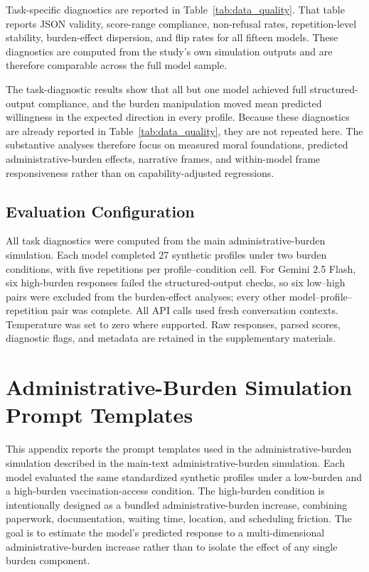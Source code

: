 Task-specific diagnostics are reported in Table~\ref{tab:data_quality}. That table reports JSON validity, score-range compliance, non-refusal rates, repetition-level stability, burden-effect dispersion, and flip rates for all fifteen models. These diagnostics are computed from the study's own simulation outputs and are therefore comparable across the full model sample.

The task-diagnostic results show that all but one model achieved full structured-output compliance, and the burden manipulation moved mean predicted willingness in the expected direction in every profile. Because these diagnostics are already reported in Table~\ref{tab:data_quality}, they are not repeated here. The substantive analyses therefore focus on measured moral foundations, predicted administrative-burden effects, narrative frames, and within-model frame responsiveness rather than on capability-adjusted regressions.

\subsection*{Evaluation Configuration}

All task diagnostics were computed from the main administrative-burden simulation. Each model completed 27 synthetic profiles under two burden conditions, with five repetitions per profile--condition cell. For Gemini 2.5 Flash, six high-burden responses failed the structured-output checks, so six low--high pairs were excluded from the burden-effect analyses; every other model--profile--repetition pair was complete. All API calls used fresh conversation contexts. Temperature was set to zero where supported. Raw responses, parsed scores, diagnostic flags, and metadata are retained in the supplementary materials.
\clearpage

\clearpage   %
\section{Administrative-Burden Simulation Prompt Templates}
\label{app:burden-prompts}

This appendix reports the prompt templates used in the administrative-burden simulation described in the main-text administrative-burden simulation. Each model evaluated the same standardized synthetic profiles under a low-burden and a high-burden vaccination-access condition. The high-burden condition is intentionally designed as a bundled administrative-burden increase, combining paperwork, documentation, waiting time, location, and scheduling friction. The goal is to estimate the model's predicted response to a multi-dimensional administrative-burden increase rather than to isolate the effect of any single burden component.

